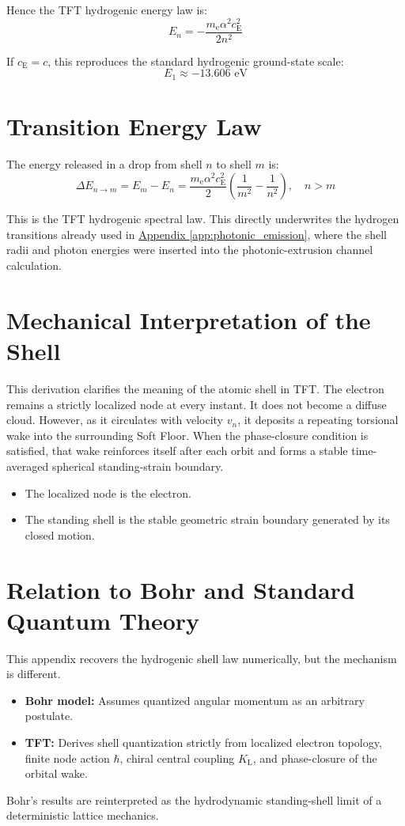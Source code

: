 Hence the TFT hydrogenic energy law is:
\begin{equation}
    E_n = -\frac{m_{\mathrm{e}} \alpha^2 c_{\mathrm{E}}^2}{2n^2}
\end{equation}

If $c_{\mathrm{E}} = c$, this reproduces the standard hydrogenic ground-state scale:
\begin{equation}
    E_1 \approx -13.606 \text{ eV}
\end{equation}

\section{Transition Energy Law}
The energy released in a drop from shell $n$ to shell $m$ is:
\begin{equation}
    \Delta E_{n\to m} = E_m - E_n = \frac{m_{\mathrm{e}} \alpha^2 c_{\mathrm{E}}^2}{2} \left( \frac{1}{m^2} - \frac{1}{n^2} \right), \quad n > m
\end{equation}

This is the TFT hydrogenic spectral law. This directly underwrites the hydrogen transitions already used in \hyperref[app:photonic_emission]{Appendix \ref*{app:photonic_emission}}, where the shell radii and photon energies were inserted into the photonic-extrusion channel calculation.

\section{Mechanical Interpretation of the Shell}
This derivation clarifies the meaning of the atomic shell in TFT. The electron remains a strictly localized node at every instant. It does not become a diffuse cloud. However, as it circulates with velocity $v_n$, it deposits a repeating torsional wake into the surrounding Soft Floor. When the phase-closure condition is satisfied, that wake reinforces itself after each orbit and forms a stable time-averaged spherical standing-strain boundary. 
\begin{itemize}
    \item The localized node is the electron.
    \item The standing shell is the stable geometric strain boundary generated by its closed motion.
\end{itemize}

\section{Relation to Bohr and Standard Quantum Theory}
This appendix recovers the hydrogenic shell law numerically, but the mechanism is different.
\begin{itemize}
    \item \textbf{Bohr model:} Assumes quantized angular momentum as an arbitrary postulate.
    \item \textbf{TFT:} Derives shell quantization strictly from localized electron topology, finite node action $\hbar$, chiral central coupling $K_{\mathrm{L}}$, and phase-closure of the orbital wake.
\end{itemize}
Bohr's results are reinterpreted as the hydrodynamic standing-shell limit of a deterministic lattice mechanics.

